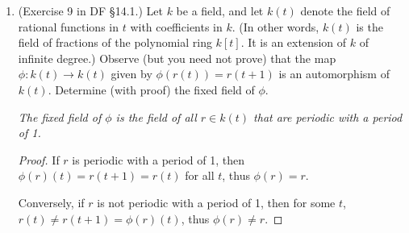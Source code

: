 \documentclass[10pt]{article}
\newcommand{\Q}{\mathbf{Q}}
\newcommand{\R}{\mathbf{R}}
\DeclareMathOperator*{\Aut}{Aut}
\begin{document}
\begin{enumerate}
\begin{proof}

Let $x \in \R$.  By definition, $x$ is the limit of some Cauchy sequence $\{q_n\}$ in $\Q$.  Suppose $f: \R \rightarrow \R$ is a continuous function that fixes $\Q$.  Since $f$ is continuous and $q_n$ is convergent, $f(\lim q_n) = \lim f(q_n)$.  Since $f$ fixes $\Q$, we know $f(q_n) = q_n$.  So $$f(x) = f(\lim q_n) = \lim f(q_n) = \lim q_n = x$$ therefore $f$ fixes $\R$ as well, since $x$ was arbitrary.  So $f$ must be the identity.

We have shown that if $\sigma \in \Aut(\R / \Q)$ is a continuous map that fixes $\Q$, then $\sigma$ is the identity.  So $\Aut(\R / \Q) = \{ 1 \}$.

\end{proof}





\item (Exercise 9 in DF \S 14.1.) Let $k$ be a field, and let $k(t)$ denote the field of rational functions in $t$ with coefficients in $k$.  (In other words, $k(t)$ is the field of fractions of the polynomial ring $k[t]$.  It is an extension of $k$ of infinite degree.)  Observe (but you need not prove) that the map $\phi: k(t) \rightarrow k(t)$ given by $\phi(r(t))=r(t+1)$ is an automorphism of $k(t)$.  Determine (with proof) the fixed field of $\phi$.



\noindent \emph{The fixed field of $\phi$ is the field of all $r \in k(t)$ that are periodic with a period of 1.}

\begin{proof}

If $r$ is periodic with a period of 1, then $\phi(r)(t) = r(t+1) = r(t)$ for all $t$, thus $\phi(r) = r$.

Conversely, if $r$ is not periodic with a period of 1, then for some $t$, $r(t) \neq r(t+1) = \phi(r)(t)$, thus $\phi(r) \neq r$.

\end{proof}

\end{enumerate}
\end{document}
